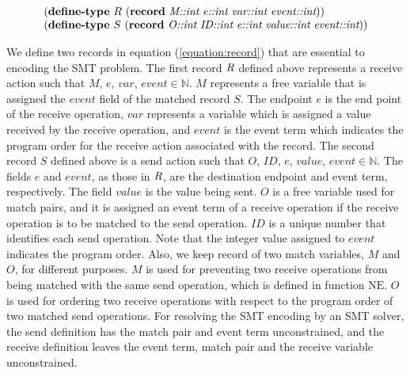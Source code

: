 \begin{equation}
\begin{array}{l}
(\textbf{define-type}\ R\ (\textbf{record}\ \emph{M::int}\ \emph{e::int}\ \emph{var::int}\ \emph{event::int})) \\
(\textbf{define-type}\ S\ (\textbf{record}\ \emph{O::int}\ \emph{ID::int}\ \emph{e::int}\ \emph{value::int}\ \emph{event::int}))
\end{array}
\label{equation:record}
\end{equation}

We define two records in equation (\ref{equation:record}) that are essential to encoding the SMT problem. The first record $\emph{R}$ defined above represents a receive action such that $\mathit{M}$, $\mathit{e}$, $\mathit{var}$, $\mathit{event} \in \mathbb{N}$. $\mathit{M}$ represents a free variable that is assigned the $\mathit{event}$ field of the matched record $S$. The endpoint $\mathit{e}$ is the end point of the receive operation, $\mathit{var}$ represents a variable which is assigned a value received by the receive operation, and $\mathit{event}$ is the event term which indicates the program order for the receive action associated with the record. The second record $S$ defined above is a send action such that $\mathit{O}$, $\mathit{ID}$, $\mathit{e}$, $\mathit{value}$, $\mathit{event} \in \mathbb{N}$. The fields $\mathit{e}$ and $\mathit{event}$, as those in $\emph{R}$, are the destination endpoint and event term, respectively. The field $\mathit{value}$ is the value being sent. $\mathit{O}$ is a free variable used for match pairs, and it is assigned an event term of a receive operation if the receive operation is to be matched to the send operation. $\mathit{ID}$ is a unique number that identifies each send operation. Note that the integer value assigned to $\mathit{event}$ indicates the program order. Also, we keep record of two match variables, $M$ and $\mathit{O}$, for different purposes. $M$ is used for preventing two receive operations from being matched with the same send operation, which is defined in function $\mathrm{NE}$. $\mathit{O}$ is used for ordering two receive operations with respect to the program order of two matched send operations. For resolving the SMT encoding by an SMT solver, the send definition has the match pair and event term unconstrained, and the receive definition leaves the event term, match pair and the receive variable unconstrained.

